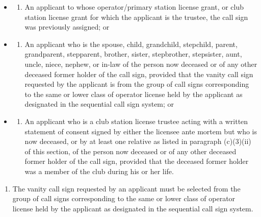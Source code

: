 \documentclass[
  letterpaper,
  DIV=11,
  numbers=noendperiod]{scrreport}
\providecommand{\tightlist}{%
  \setlength{\itemsep}{0pt}\setlength{\parskip}{0pt}}\usepackage{longtable,booktabs,array}
\begin{document}
\begin{itemize}
  \begin{itemize}
  \item
    \begin{enumerate}
    \def\labelenumi{(\roman{enumi})}
    \tightlist
    \item
      An applicant to whose operator/primary station license grant, or
      club station license grant for which the applicant is the trustee,
      the call sign was previously assigned; or
    \end{enumerate}
  \item
    \begin{enumerate}
    \def\labelenumi{(\roman{enumi})}
    \setcounter{enumi}{1}
    \tightlist
    \item
      An applicant who is the spouse, child, grandchild, stepchild,
      parent, grandparent, stepparent, brother, sister, stepbrother,
      stepsister, aunt, uncle, niece, nephew, or in-law of the person
      now deceased or of any other deceased former holder of the call
      sign, provided that the vanity call sign requested by the
      applicant is from the group of call signs corresponding to the
      same or lower class of operator license held by the applicant as
      designated in the sequential call sign system; or
    \end{enumerate}
  \item
    \begin{enumerate}
    \def\labelenumi{(\roman{enumi})}
    \setcounter{enumi}{2}
    \tightlist
    \item
      An applicant who is a club station license trustee acting with a
      written statement of consent signed by either the licensee ante
      mortem but who is now deceased, or by at least one relative as
      listed in paragraph (c)(3)(ii) of this section, of the person now
      deceased or of any other deceased former holder of the call sign,
      provided that the deceased former holder was a member of the club
      during his or her life.
    \end{enumerate}
  \end{itemize}
\end{itemize}

\begin{enumerate}
\def\labelenumi{(\alph{enumi})}
\setcounter{enumi}{3}
\tightlist
\item
  The vanity call sign requested by an applicant must be selected from
  the group of call signs corresponding to the same or lower class of
  operator license held by the applicant as designated in the sequential
  call sign system.
\end{enumerate}
\end{document}
